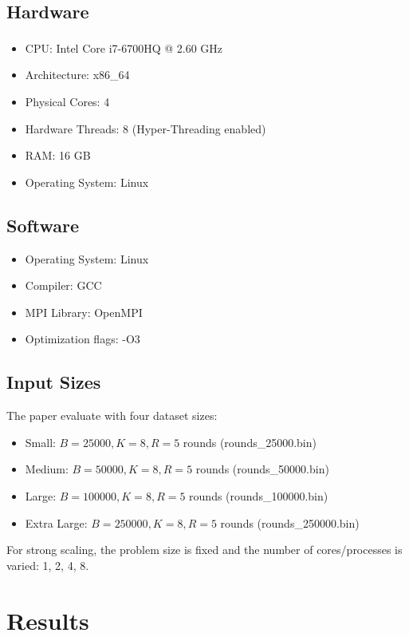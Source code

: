 \documentclass[conference]{IEEEtran}
\begin{document}
\subsection{Hardware}

\begin{itemize}
    \item CPU: Intel\textsuperscript{\textregistered} Core\texttrademark{} i7-6700HQ @ 2.60 GHz
    \item Architecture: x86\_64
    \item Physical Cores: 4
    \item Hardware Threads: 8 (Hyper-Threading enabled)
    \item RAM: 16 GB
    \item Operating System: Linux
\end{itemize}

\subsection{Software}

\begin{itemize}
    \item Operating System: Linux
    \item Compiler: GCC
    \item MPI Library: OpenMPI
    \item Optimization flags: -O3
\end{itemize}

\subsection{Input Sizes}

The paper evaluate with four dataset sizes:
\begin{itemize}
    \item Small: $B=25000, K=8, R=5$ rounds (rounds\_25000.bin)
    \item Medium: $B=50000, K=8, R=5$ rounds (rounds\_50000.bin)
    \item Large: $B=100000, K=8, R=5$ rounds (rounds\_100000.bin)
    \item Extra Large: $B=250000, K=8, R=5$ rounds (rounds\_250000.bin)
\end{itemize}

For strong scaling, the problem size is fixed and the number of cores/processes is varied: 1, 2, 4, 8.

\section{Results}
\label{sec:results}
\end{document}
